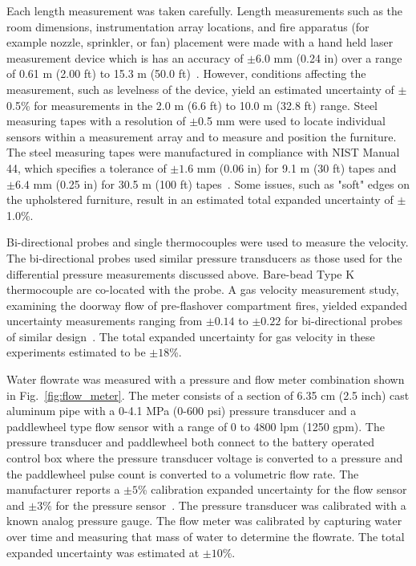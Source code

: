 \documentclass[12pt,oneside]{book}
\begin{document}
Each length measurement was taken carefully. Length measurements such as the room dimensions,
instrumentation array locations, and fire apparatus (for example nozzle, sprinkler, or fan) placement were made with a hand held laser measurement device which is has an accuracy of $\pm6.0$ mm (0.24 in) over a range of 0.61 m (2.00 ft) to 15.3 m (50.0 ft)~\cite{Stanley}. However, conditions affecting the measurement, such as levelness of the device, yield an estimated uncertainty of $\pm$0.5\% for measurements in the 2.0 m (6.6 ft) to 10.0 m (32.8 ft) range. Steel measuring tapes with a resolution of $\pm$0.5 mm were used to locate individual sensors within a measurement array and to measure and position the furniture. The steel measuring tapes were manufactured in compliance with NIST Manual 44, which specifies a tolerance of $\pm1.6$ mm (0.06 in) for 9.1 m (30 ft) tapes and $\pm6.4$ mm (0.25 in) for 30.5 m (100 ft) tapes~\cite{NIST_Manual_44}. Some issues, such as "soft" edges on the upholstered furniture, result in an estimated total expanded uncertainty of $\pm$1.0\%. 

Bi-directional probes and single thermocouples were used to measure the velocity. The bi-directional probes used similar pressure transducers as those used for the differential pressure measurements discussed above. Bare-bead Type K thermocouple are co-located with the probe. A gas velocity measurement study, examining the doorway flow of pre-flashover compartment fires, yielded expanded uncertainty measurements ranging from $\pm0.14$ to $\pm0.22$ for bi-directional probes of similar design~\cite{Bryant:FSJ2009}. The total expanded uncertainty for gas velocity in these experiments estimated to be $\pm18$\%.   

Water flowrate was measured with a pressure and flow meter combination shown in Fig.~\ref{fig:flow_meter}. The meter consists of a section of 6.35 cm (2.5 inch) cast aluminum pipe with a 0-4.1 MPa (0-600 psi) pressure transducer and a paddlewheel type flow sensor with a range of 0 to 4800 lpm (1250 gpm). The pressure transducer and paddlewheel both connect to the battery operated control box where the pressure transducer voltage is converted to a pressure and the paddlewheel pulse count is converted to a volumetric flow rate. The manufacturer reports a $\pm5$\% calibration expanded uncertainty for the flow sensor and $\pm3$\%  for the pressure sensor~\cite{Akron}. The pressure transducer was calibrated with a known analog pressure gauge. The flow meter was calibrated by capturing water over time and measuring that mass of water to determine the flowrate. The total expanded uncertainty was estimated at $\pm10$\%. 
\end{document}
